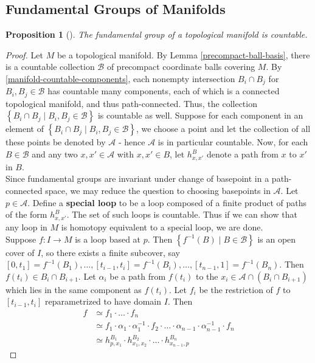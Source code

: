 \documentclass[reqno]{amsart}
\theoremstyle{plain}%
\newtheorem{proposition}[theorem]{Proposition}
\theoremstyle{definition}
\theoremstyle{remark}
\begin{document}
    \subsection*{Fundamental Groups of Manifolds}
    \begin{proposition}[]
        The fundamental group of a topological manifold is countable.
    \end{proposition}
    \begin{proof}
        Let $M$ be a topological manifold. By Lemma \ref{precompact-ball-basis},
        there is a countable collection $\mathcal{B}$ of precompact coordinate
        balls covering $M$. By \ref{manifold-countable-components}, each nonempty
        intersection $B_i \cap B_j$ for $B_i, B_j \in \mathcal{B}$ has countable
        many components, each of which is a connected topological manifold, and
        thus path-connected. Thus, the collection
        $\left\{ B_i \cap B_j  \mid B_i, B_j \in \mathcal{B} \right\} $ is
        countable as well. Suppose for each component in
        an element of  $\left\{ B_i \cap B_j  \mid B_i,B_j \in \mathcal{B} \right\}
        $, we choose a point and let the collection of all these points be denoted
        by $\mathcal{A}$ - hence $\mathcal{A}$ is in particular countable. Now,
        for each $B \in \mathcal{B}$ and any two $x,x' \in \mathcal{A}$ with
        $x,x' \in B$, let $h_{x,x'}^{B}$ denote a path from $x$ to $x'$ in $B$.\\
        \linebreak
        Since fundamental groups are invariant under change of basepoint in
        a path-connected space, we may reduce the question to choosing basepoints
        in $\mathcal{A}$. Let $p \in \mathcal{A}$. Define a \textbf{special loop}
        to be a loop composed of a finite product of paths of the form
        $h_{x,x'}^{B}$. The set of such loops is countable. Thus if we can show
        that any loop in $M$ is homotopy equivalent to a special loop, we are
        done.\\
        Suppose $f  \colon I \to M$ is a loop based at $p$. Then
        $\left\{ f^{-1}(B)  \mid B \in \mathcal{B} \right\} $ is an open cover of
        $I$, so there exists a finite subcover, say
        $\left[ 0,t_1 \right]  = f^{-1}(B_1), \ldots, 
        \left[ t_{i-1},t_i \right] = f^{-1}(B_i), \ldots , \left[ 
        t_{n-1}, 1 \right]  = f^{-1}(B_n)$. Then
        $f(t_i) \in B_i \cap B_{i+1}$. Let
        $\alpha_i$ be a path from $f(t_i)$ to the $x_i \in \mathcal{A}\cap 
        \left( B_i \cap B_{i+1} \right) $ which lies in the same component as
        $f(t_i)$. Let
        $f_i $ be the restriction of $f$ to $\left[ t_{i-1},t_i \right]
        $ reparametrized to have domain $I$. Then
       \begin{align*}
           f &\simeq f_1 \cdot  \ldots \cdot  f_n\\
             &\simeq f_1 \cdot \alpha_1 \cdot \alpha_1^{-1} \cdot f_2 \cdot \ldots
             \cdot \alpha_{n-1} \cdot \alpha_{n-1}^{-1} \cdot f_n\\
             &\simeq h_{p,x_1}^{B_1} \cdot h_{x_1,x_2}^{B_2} \cdot \ldots
             \cdot h_{x_{n-1}, p}^{B_n}
       \end{align*} 
    \end{proof}
\end{document}
